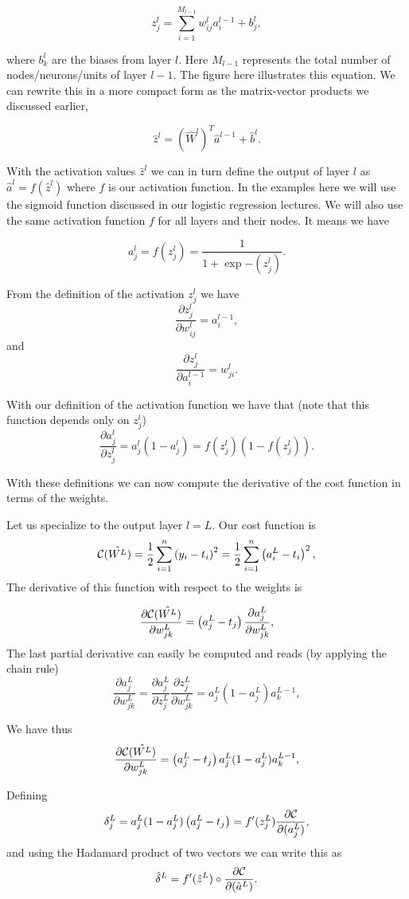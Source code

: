 \[
z_j^l = \sum_{i=1}^{M_{l-1}}w_{ij}^la_i^{l-1}+b_j^l,
\]

where $b_k^l$ are the biases from layer $l$.  Here $M_{l-1}$
represents the total number of nodes/neurons/units of layer $l-1$. The
figure here illustrates this equation.  We can rewrite this in a more
compact form as the matrix-vector products we discussed earlier,

\[
\hat{z}^l = \left(\hat{W}^l\right)^T\hat{a}^{l-1}+\hat{b}^l.
\]

With the activation values $\hat{z}^l$ we can in turn define the
output of layer $l$ as $\hat{a}^l = f(\hat{z}^l)$ where $f$ is our
activation function. In the examples here we will use the sigmoid
function discussed in our logistic regression lectures. We will also use the same activation function $f$ for all layers
and their nodes.  It means we have

\[
a_j^l = f(z_j^l) = \frac{1}{1+\exp{-(z_j^l)}}.
\]

From the definition of the activation $z_j^l$ we have
\[
\frac{\partial z_j^l}{\partial w_{ij}^l} = a_i^{l-1},
\]
and
\[
\frac{\partial z_j^l}{\partial a_i^{l-1}} = w_{ji}^l. 
\]

With our definition of the activation function we have that (note that this function depends only on $z_j^l$)
\[
\frac{\partial a_j^l}{\partial z_j^{l}} = a_j^l(1-a_j^l)=f(z_j^l)(1-f(z_j^l)). 
\]

With these definitions we can now compute the derivative of the cost function in terms of the weights.

Let us specialize to the output layer $l=L$. Our cost function is
\[
{\cal C}(\hat{W^L})  =  \frac{1}{2}\sum_{i=1}^n\left(y_i - t_i\right)^2=\frac{1}{2}\sum_{i=1}^n\left(a_i^L - t_i\right)^2, 
\]
The derivative of this function with respect to the weights is

\[
\frac{\partial{\cal C}(\hat{W^L})}{\partial w_{jk}^L}  =  \left(a_j^L - t_j\right)\frac{\partial a_j^L}{\partial w_{jk}^{L}}, 
\]
The last partial derivative can easily be computed and reads (by applying the chain rule)
\[
\frac{\partial a_j^L}{\partial w_{jk}^{L}} = \frac{\partial a_j^L}{\partial z_{j}^{L}}\frac{\partial z_j^L}{\partial w_{jk}^{L}}=a_j^L(1-a_j^L)a_k^{L-1},  
\]

We have thus
\[
\frac{\partial{\cal C}(\hat{W^L})}{\partial w_{jk}^L}  =  \left(a_j^L - t_j\right)a_j^L(1-a_j^L)a_k^{L-1}, 
\]

Defining
\[
\delta_j^L = a_j^L(1-a_j^L)\left(a_j^L - t_j\right) = f'(z_j^L)\frac{\partial {\cal C}}{\partial (a_j^L)},
\]
and using the Hadamard product of two vectors we can write this as
\[
\hat{\delta}^L = f'(\hat{z}^L)\circ\frac{\partial {\cal C}}{\partial (\hat{a}^L)}.
\]

